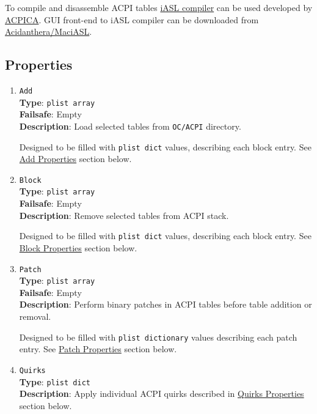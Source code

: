 \documentclass[]{article}
\makeatletter
\renewcommand{\label}[1]{%
\zref@wrapper@immediate{\oldlabel{#1}}}  %
\makeatother
\begin{document}
To compile and disassemble ACPI tables \href{https://github.com/acpica/acpica}{iASL compiler}
can be used developed by \href{https://www.acpica.org}{ACPICA}. GUI front-end to iASL compiler
can be downloaded from \href{https://github.com/acidanthera/MaciASL/releases}{Acidanthera/MaciASL}.

\subsection{Properties}\label{acpiprops}

\begin{enumerate}
\item
  \texttt{Add}\\
  \textbf{Type}: \texttt{plist\ array}\\
  \textbf{Failsafe}: Empty\\
  \textbf{Description}: Load selected tables from \texttt{OC/ACPI}
  directory.

  Designed to be filled with \texttt{plist\ dict} values, describing each block entry.
  See \hyperref[acpipropsadd]{Add Properties} section below.

\item
  \texttt{Block}\\
  \textbf{Type}: \texttt{plist\ array}\\
  \textbf{Failsafe}: Empty\\
  \textbf{Description}: Remove selected tables from ACPI stack.

  Designed to be filled with \texttt{plist\ dict} values, describing each block entry.
  See \hyperref[acpipropsblock]{Block Properties} section below.

\item
  \texttt{Patch}\\
  \textbf{Type}: \texttt{plist\ array}\\
  \textbf{Failsafe}: Empty\\
  \textbf{Description}: Perform binary patches in ACPI tables before
  table addition or removal.

  Designed to be filled with \texttt{plist\ dictionary} values describing each
  patch entry. See \hyperref[acpipropspatch]{Patch Properties} section below.

\item
  \texttt{Quirks}\\
  \textbf{Type}: \texttt{plist\ dict}\\
  \textbf{Description}: Apply individual ACPI quirks described
  in \hyperref[acpipropsquirks]{Quirks Properties} section below.

\end{enumerate}
\end{document}
